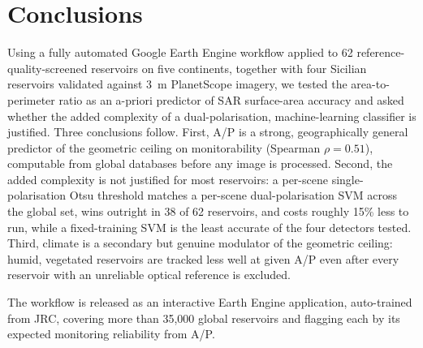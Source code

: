 \section{Conclusions}
\label{sec:conclusions}

Using a fully automated Google Earth Engine workflow applied to 62
reference-quality-screened reservoirs on five continents, together with four
Sicilian reservoirs validated against 3~m PlanetScope imagery, we tested the
area-to-perimeter ratio as an a-priori predictor of SAR surface-area accuracy
and asked whether the added complexity of a dual-polarisation,
machine-learning classifier is justified. Three conclusions follow. First,
A/P is a strong, geographically general predictor of the geometric ceiling on
monitorability (Spearman $\rho = 0.51$), computable from global databases
before any image is processed. Second, the added complexity is not justified
for most reservoirs: a per-scene single-polarisation Otsu threshold matches a
per-scene dual-polarisation SVM across the global set, wins outright in 38 of
62 reservoirs, and costs roughly 15\% less to run, while a fixed-training SVM
is the least accurate of the four detectors tested. Third, climate is a
secondary but genuine modulator of the geometric ceiling: humid, vegetated
reservoirs are tracked less well at given A/P even after every reservoir with
an unreliable optical reference is excluded.

The workflow is released as an interactive Earth Engine application,
auto-trained from JRC, covering more than 35,000 global reservoirs and
flagging each by its expected monitoring reliability from A/P.
